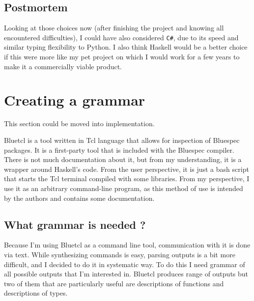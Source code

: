 \documentclass[12pt]{report}
\begin{document}
\subsection{Postmortem}
Looking at those choices now (after finishing the project and knowing all encountered difficulties), I could have also considered \verb!C#!, due to its speed and similar typing flexibility to Python. I also think Haskell would be a better choice if this were more like my pet project on which I would work for a few years to make it a commercially viable product.  
  
\section{Creating a grammar}  
This section could be moved into implementation.  
  
\begin{tcolorbox}[title=Bluetcl]  
  Bluetcl is a tool written in Tcl language that allows for inspection of Bluespec packages. It is a first-party tool that is included with the Bluespec compiler. There is not much documentation about it, but from my understanding, it is a wrapper around Haskell's code.  
  From the user perspective, it is just a bash script that starts the Tcl terminal compiled with some libraries. From my perspective, I use it as an arbitrary command-line program, as this method of use is intended by the authors and contains some documentation.  
\end{tcolorbox} 
\subsection{What grammar is needed ?}
Because I'm using Bluetcl as a command line tool, communication with it is done via text. 
While synthesizing commands is easy, parsing outputs is a bit more difficult, and I decided to do it in systematic way. 
To do this I need grammar of all possible outputs that I'm interested in. 
Bluetcl produces range of outputs but two of them that are particularly useful are descriptions of functions and descriptions of types.
\end{document}

